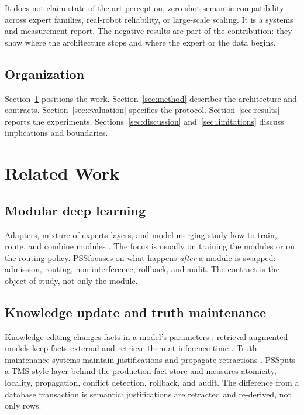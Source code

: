 \documentclass[10pt]{article}
\newcommand{\pss}{PSS}
\begin{document}
It does not claim state-of-the-art perception, zero-shot semantic compatibility
across expert families, real-robot reliability, or large-scale scaling. It is a
systems and measurement report. The negative results are part of the
contribution: they show where the architecture stops and where the expert or
the data begins.

\subsection{Organization}

Section~\ref{sec:related} positions the work. Section~\ref{sec:method} describes
the architecture and contracts. Section~\ref{sec:evaluation} specifies the
protocol. Section~\ref{sec:results} reports the experiments. Sections~\ref{sec:discussion}
and~\ref{sec:limitations} discuss implications and boundaries.

\section{Related Work}
\label{sec:related}

\subsection{Modular deep learning}

Adapters, mixture-of-experts layers, and model merging study how to train,
route, and combine modules \citep{pfeiffer2023modular}. The focus is usually on
training the modules or on the routing policy. \pss focuses on what happens
\emph{after} a module is swapped: admission, routing, non-interference,
rollback, and audit. The contract is the object of study, not only the module.

\subsection{Knowledge update and truth maintenance}

Knowledge editing changes facts in a model's parameters
\citep{meng2022rome,decao2021editing}; retrieval-augmented models keep facts
external and retrieve them at inference time \citep{lewis2020rag}. Truth
maintenance systems maintain justifications and propagate retractions
\citep{doyle1979tms}. \pss puts a TMS-style layer behind the production fact
store and measures atomicity, locality, propagation, conflict detection,
rollback, and audit. The difference from a database transaction is semantic:
justifications are retracted and re-derived, not only rows.
\end{document}
